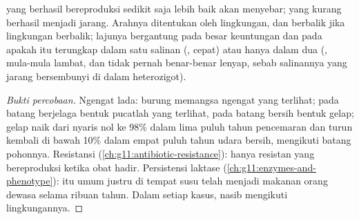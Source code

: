 \begin{proposition}\label{prop:g12:selection-drift-speciation:direction}
 yang  berhasil bereproduksi sedikit saja lebih baik
akan menyebar;  yang  kurang berhasil menjadi jarang.
Arahnya ditentukan oleh lingkungan, dan berbalik jika lingkungan
berbalik; lajunya bergantung pada besar keuntungan dan pada apakah 
itu terungkap dalam satu salinan (, cepat) atau hanya dalam dua
(, mula-mula lambat, dan tidak pernah benar-benar lenyap, sebab
salinannya yang jarang bersembunyi di dalam heterozigot).
\end{proposition}
\begin{proof}[Bukti percobaan]
Ngengat lada: burung memangsa ngengat yang terlihat; pada batang
berjelaga bentuk pucatlah yang terlihat, pada batang bersih bentuk
gelap;  gelap naik dari nyaris nol ke 98\% dalam lima
puluh tahun pencemaran dan turun kembali di bawah 10\% dalam empat
puluh tahun udara bersih, mengikuti batang pohonnya. Resistansi
 (\cref{ch:g11:antibiotic-resistance}): hanya  
resistan yang bereproduksi ketika obat hadir. Persistensi laktase
(\cref{ch:g11:enzymes-and-phenotype}):  itu umum justru di tempat
susu telah menjadi makanan orang dewasa selama ribuan tahun. Dalam
setiap kasus, nasib  mengikuti lingkungannya.
\end{proof}

